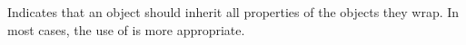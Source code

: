 
Indicates that an object should inherit all properties of the objects
they wrap. In most cases, the use of  is more
appropriate.

